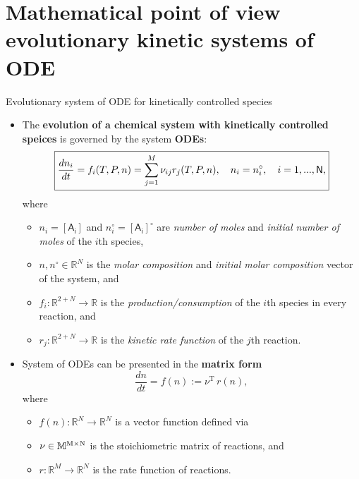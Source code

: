 \section{Mathematical point of view evolutionary kinetic systems of ODE}
%
%
\begin{frame}{Evolutionary system of ODE for kinetically controlled species}
	\footnotesize
	\begin{itemize}
	\item The \alert{\bf evolution of a chemical system with kinetically controlled speices} is governed by the system \textbf{ODEs}:
	\[
	\boxed{\frac{d n_{i}}{dt} = f_{i}(T,P, n) =\sum_{j=1}^{M}\nu_{ij}r_{j}(T,P,n),
		\quad n_{i} = n^\circ_i, \quad i=1,...,{\sf N},}
	\]
	\vskip -5pt
	where
	{
	\begin{itemize}
		\item $n_{i} = \mathsf{[A_i]}$ and $n^\circ_i = \mathsf{[A_i]^\circ}$ are \emph{number of moles} and \emph{initial number of moles} of the $i$th species,
		\item $n, n^\circ \in\mathbb{R}^{N}$ is the \emph{molar composition} and \emph{initial molar composition} vector of the system, and
		\item $f_{i} :\mathbb{R}^{2+N}\rightarrow\mathbb{R}$ is the \emph{production/consumption} of the $i$th species in every reaction, and 
		\item $r_{j}:\mathbb{R}^{2+N}\rightarrow\mathbb{R}$ is the \emph{kinetic rate function} of the $j$th reaction.
	\end{itemize}
	}
	\pause
	\item System of ODEs can be presented in the \alert{\bf matrix form}\\
	\[
	\boxed{\frac{d n}{dt}= f(n):=\nu^{\mathrm{T}}\, r(n),}
	\]
	\vskip -5pt
	where
	{
	\scriptsize
	\begin{itemize}
		\item $f (n): \mathbb{R}^{N} \rightarrow \mathbb{R}^{N}$ is a vector function defined via 
		\item $\nu \in \mathbb{M}^{{\rm M} \times {\rm N}}$ is the stoichiometric matrix of reactions, and
		\item $r: \mathbb{R}^{M} \rightarrow \mathbb{R}^{N}$ is the rate function of reactions.
	\end{itemize}
	}
	\end{itemize}
\end{frame}
